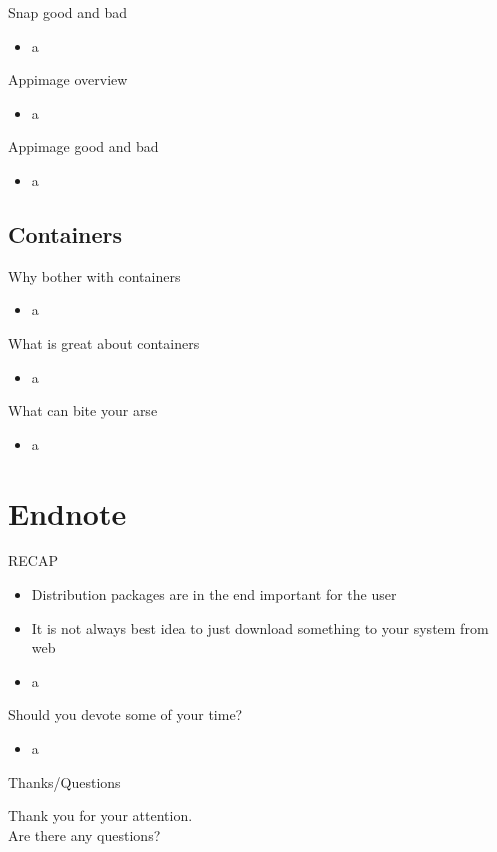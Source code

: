 \documentclass{beamer}
\begin{document}
\begin{frame}[t]{Snap good and bad}
	\begin{itemize}
	\item a
	\end{itemize}
\end{frame}

\begin{frame}[t]{Appimage overview}
	\begin{itemize}
	\item a
	\end{itemize}
\end{frame}

\begin{frame}[t]{Appimage good and bad}
	\begin{itemize}
	\item a
	\end{itemize}
\end{frame}

\subsection{Containers}

\begin{frame}[t]{Why bother with containers}
	\begin{itemize}
	\item a
	\end{itemize}
\end{frame}

\begin{frame}[t]{What is great about containers}
	\begin{itemize}
	\item a
	\end{itemize}
\end{frame}

\begin{frame}[t]{What can bite your arse}
	\begin{itemize}
	\item a
	\end{itemize}
\end{frame}

\section{Endnote}

\begin{frame}[t]{RECAP}
	\begin{itemize}
	\item Distribution packages are in the end important for the user
	\item It is not always best idea to just download something to your system from web
	\item a
	\end{itemize}
\end{frame}

\begin{frame}[t]{Should you devote some of your time?}
	\begin{itemize}
	\item a
	\end{itemize}
\end{frame}

\begin{frame}{Thanks/Questions}
	\begin{center}
	Thank you for your attention.\\
	Are there any questions?
	\end{center}
\end{frame}
\end{document}
